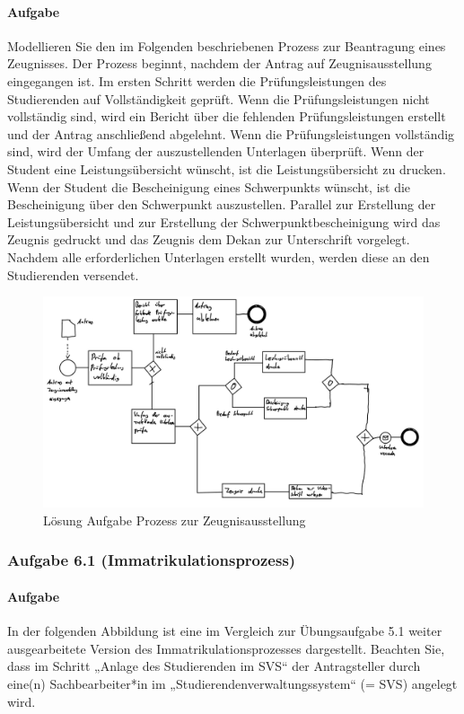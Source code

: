     \paragraph*{Aufgabe}
        Modellieren Sie den im Folgenden beschriebenen Prozess zur Beantragung eines Zeugnisses. Der Prozess beginnt, nachdem der Antrag auf Zeugnisausstellung eingegangen ist. Im ersten Schritt werden die Prüfungsleistungen des Studierenden auf Vollständigkeit geprüft. Wenn
        die Prüfungsleistungen nicht vollständig sind, wird ein Bericht über die fehlenden Prüfungsleistungen erstellt und der Antrag anschließend abgelehnt. Wenn die Prüfungsleistungen vollständig sind, wird der Umfang der auszustellenden Unterlagen überprüft. Wenn der Student eine Leistungsübersicht wünscht, ist die Leistungsübersicht zu drucken. Wenn der Student die Bescheinigung eines Schwerpunkts wünscht, ist die Bescheinigung über den Schwerpunkt auszustellen. Parallel zur Erstellung
        der Leistungsübersicht und zur Erstellung der Schwerpunktbescheinigung wird das Zeugnis gedruckt und das Zeugnis dem Dekan zur Unterschrift vorgelegt. Nachdem alle erforderlichen Unterlagen erstellt wurden, werden diese an den Studierenden versendet.
        \begin{figure}[h]
            \centering
            \includegraphics[width=\textwidth]{image/Loesung_Aufgabe_Prozess_zur_Zeugnissaustellung.png}
            \caption{Lösung Aufgabe Prozess zur Zeugnisausstellung}
            \label{fig:Loesung_Aufgabe_Prozess_zur_Zeugnissaustellung}
        \end{figure}

\subsubsection*{Aufgabe 6.1 (Immatrikulationsprozess)}
    \paragraph*{Aufgabe}
        In der folgenden Abbildung ist eine im Vergleich zur Übungsaufgabe 5.1 weiter ausgearbeitete Version des Immatrikulationsprozesses dargestellt. Beachten Sie, dass im Schritt „Anlage des Studierenden im SVS“ der Antragsteller durch eine(n) Sachbearbeiter*in im „Studierendenverwaltungssystem“ (= SVS) angelegt wird.


